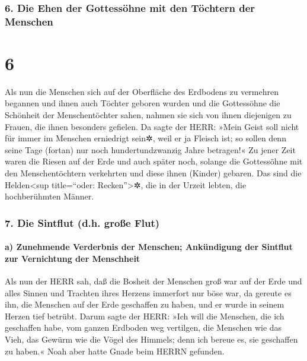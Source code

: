 \hypertarget{die-ehen-der-gottessuxf6hne-mit-den-tuxf6chtern-der-menschen}{%
\subsubsection{6. Die Ehen der Gottessöhne mit den Töchtern der
Menschen}\label{die-ehen-der-gottessuxf6hne-mit-den-tuxf6chtern-der-menschen}}

\hypertarget{section-5}{%
\section{6}\label{section-5}}

 Als nun die Menschen sich auf der Oberfläche des
Erdbodens zu vermehren begannen und ihnen auch Töchter geboren wurden
 und die Gottessöhne die Schönheit der Menschentöchter
sahen, nahmen sie sich von ihnen diejenigen zu Frauen, die ihnen
besonders gefielen.  Da sagte der HERR: »Mein Geist soll
nicht für immer im Menschen erniedrigt sein✲, weil er ja Fleisch ist; so
sollen denn seine Tage (fortan) nur noch hundertundzwanzig Jahre
betragen!«  Zu jener Zeit waren die Riesen auf der Erde
und auch später noch, solange die Gottessöhne mit den Menschentöchtern
verkehrten und diese ihnen (Kinder) gebaren. Das sind die
Helden\textless sup title=``oder: Recken''\textgreater✲, die in der
Urzeit lebten, die hochberühmten Männer.

\hypertarget{die-sintflut-d.h.-grouxdfe-flut}{%
\subsubsection{7. Die Sintflut (d.h. große
Flut)}\label{die-sintflut-d.h.-grouxdfe-flut}}

\hypertarget{a-zunehmende-verderbnis-der-menschen-ankuxfcndigung-der-sintflut-zur-vernichtung-der-menschheit}{%
\paragraph{a) Zunehmende Verderbnis der Menschen; Ankündigung der
Sintflut zur Vernichtung der
Menschheit}\label{a-zunehmende-verderbnis-der-menschen-ankuxfcndigung-der-sintflut-zur-vernichtung-der-menschheit}}

 Als nun der HERR sah, daß die Bosheit der Menschen groß
war auf der Erde und alles Sinnen und Trachten ihres Herzens immerfort
nur böse war,  da gereute es ihn, die Menschen auf der
Erde geschaffen zu haben, und er wurde in seinem Herzen tief betrübt.
 Darum sagte der HERR: »Ich will die Menschen, die ich
geschaffen habe, vom ganzen Erdboden weg vertilgen, die Menschen wie das
Vieh, das Gewürm wie die Vögel des Himmels; denn ich bereue es, sie
geschaffen zu haben.«  Noah aber hatte Gnade beim HERRN
gefunden.

